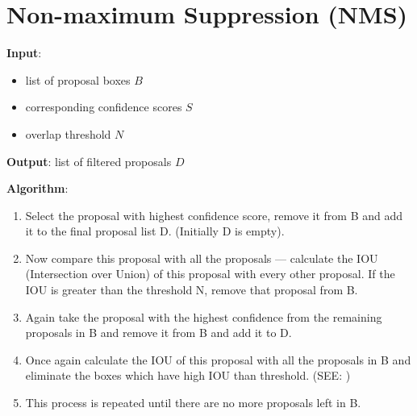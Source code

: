 \section{Non-maximum Suppression (NMS) \cite{medium/towardsdatascience.com/non-maximum-suppression-nms-93ce178e177c}}\label{Non-maximum Suppression (NMS)}

\textbf{Input}:
\begin{itemize}
    \item list of proposal boxes $B$

    \item corresponding confidence scores $S$
    
    \item overlap threshold $N$
\end{itemize}

\noindent \textbf{Output}: list of filtered proposals $D$

\vspace{0.2cm}
\noindent \textbf{Algorithm}:
\begin{enumerate}
    \item Select the proposal with highest confidence score, remove it from B and add it to the final proposal list D. (Initially D is empty).

    \item Now compare this proposal with all the proposals — calculate the IOU (Intersection over Union) of this proposal with every other proposal. If the IOU is greater than the threshold N, remove that proposal from B.

    \item Again take the proposal with the highest confidence from the remaining proposals in B and remove it from B and add it to D.

    \item Once again calculate the IOU of this proposal with all the proposals in B and eliminate the boxes which have high IOU than threshold. (SEE: )

    \item This process is repeated until there are no more proposals left in B.

\end{enumerate}

